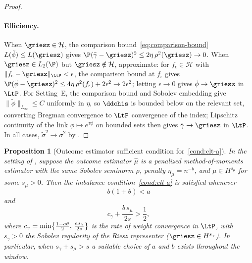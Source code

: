 \documentclass{article}
\newtheorem{proposition}[theorem]{Proposition}
\begin{document}
\begin{proof}
\paragraph{Efficiency.}
When $\griesz \in \mathcal{H}$,
the comparison bound~\eqref{eq:comparison-bound}
$L(\tilde\phi) \le L(\griesz)$
gives $\P(\tilde\gamma - \griesz)^2
  \le 2\eta\,\rho^2(\griesz) \to 0$.
When $\griesz \in L_2(\P)$
but $\griesz \notin \mathcal{H}$,
approximate:
for $f_\epsilon \in \mathcal{H}$
with $\|f_\epsilon - \griesz\|_{\LtP} < \epsilon$,
the comparison bound at $f_\epsilon$ gives
$\P(\tilde\phi - \griesz)^2
  \le 4\eta\,\rho^2(f_\epsilon) + 2\epsilon^2
  \to 2\epsilon^2$;
letting $\epsilon \to 0$
gives $\tilde\phi \to \griesz$ in $\LtP$.
For Setting~E,
the comparison bound and Sobolev embedding
give $\|\tilde\phi\|_{L_\infty} \le C$
uniformly in $\eta$,
so $\ddchis$ is bounded below
on the relevant set,
converting Bregman convergence
to $\LtP$ convergence of the index;
Lipschitz continuity of the link
$\phi \mapsto e^{\tau\phi}$
on bounded sets
then gives $\tilde\gamma \to \griesz$ in $\LtP$.
In all cases,
$\tilde\sigma^2 \to \sigma^2$
by .
\end{proof}

\begin{proposition}[Outcome estimator
  sufficient condition for~\ref{cond:clt-a}]
\label{prop:outcome-clt-condition}
In the setting of ,
suppose the outcome estimator $\hat\mu$
is a penalized method-of-moments estimator
with the same Sobolev seminorm $\rho$,
penalty $\eta_\mu = n^{-b}$,
and $\mu \in H^{s_\mu}$ for some $s_\mu > 0$.
Then the imbalance condition~\ref{cond:clt-a}
is satisfied whenever
\begin{equation}\label{eq:outcome-clt-condition}
b(1+\theta) < a
\end{equation}
and
\begin{equation}\label{eq:outcome-dr-condition}
c_\gamma + \frac{b\,s_\mu}{2s} > \frac{1}{2},
\end{equation}
where $c_\gamma
  = \min\!\qty{
    \frac{1-a\theta}{2},\,
    \frac{a s_\gamma}{2s}}$
is the rate of weight convergence
in $\LtP$,
with $s_\gamma > 0$ the Sobolev regularity
of the Riesz representer
($\griesz \in H^{s_\gamma}$).
In particular,
when $s_\gamma + s_\mu > s$
a suitable choice of $a$ and $b$
exists throughout the window.
\end{proposition}
\end{document}
